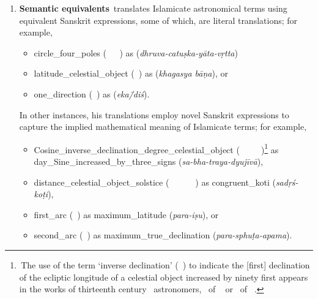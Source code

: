 \begin{enumerate}[topsep=0pt]
    \item \textbf{Semantic equivalents}\quad \Nityananda\ translates Islamicate astronomical terms using equivalent Sanskrit expressions, some of which, are literal translations; for example,
    \begin{itemize}
    \item  \gls{circle_four_poles}  (\textit{\dayiri\idafavowel\ \marri\ \biaqtab\idafaconsonant\ \arbai}) as  (\textit{dhruva-catuṣka-yāta-vṛtta})
    \item \gls{latitude_celestial_object}  (\ard\idafaconsonant\ \kawkab) as  (\textit{khagasya bāṇa}), or
    \item \gls{one_direction}   (\yik\ \jahat) as   (\textit{eka\=/diś}).
    \end{itemize}
    In other instances, his translations employ novel Sanskrit expressions to capture the implied mathematical meaning of Islamicate terms; for example,
    \begin{itemize}
        \item \gls{Cosine_inverse_declination_degree_celestial_object}\linebreak {}  (\jayb\idafaconsonant\ \tamam\idafaconsonant\ \mayl\idafaconsonant\ \mankus\idafaconsonant\ \daraji\idafavowel\ \kawkab)\footnote{\,The use of the term `inverse declination' (\almayl\ \almakus) to indicate the [first] declination of the ecliptic longitude of a celestial object increased by ninety first appears in the works of thirteenth century \Maragha\ astronomers, \eg \ZijIlkhani\ of \alTusi\ \parencite[188]{HamadanialTusi} or \Tajalazyaj\ of \alMaghribi\ \parencite[196]{Dorce}.} as \gls{day_Sine_increased_by_three_signs}  (\textit{sa-bha-traya-dyujīvā}),
        \item \gls{distance_celestial_object_solstice}  (\textit{\bud\idafaconsonant\ \kawkab\ \az\ \guillemotleft\dayiri\idafavowel\ \marri\ \biaqtab\idafaconsonant\ \arbai\guillemotright})  as \gls{congruent_koti}   (\textit{sadṛś-koṭi}),
        \item \gls{first_arc}  (\qaws\idafaconsonant\ \avval) as \gls{maximum_latitude}  (\textit{para-iṣu}), or
        \item \gls{second_arc}  (\qaws\idafaconsonant\ \duvum) as \gls{maximum_true_declination}  (\textit{para-sphuṭa-apama}).
    \end{itemize}
    

\end{enumerate}
